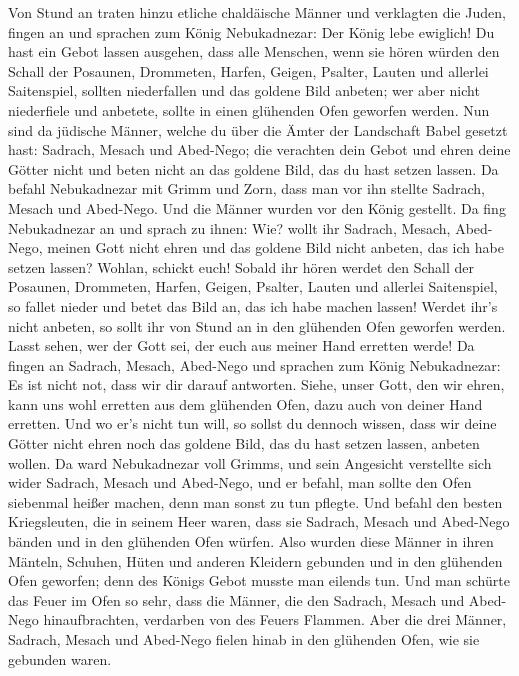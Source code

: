  Von Stund an traten hinzu etliche chaldäische Männer und
verklagten die Juden,  fingen an und sprachen zum König
Nebukadnezar: Der König lebe ewiglich!  Du hast ein Gebot
lassen ausgehen, dass alle Menschen, wenn sie hören würden den Schall
der Posaunen, Drommeten, Harfen, Geigen, Psalter, Lauten und allerlei
Saitenspiel, sollten niederfallen und das goldene Bild anbeten;
 wer aber nicht niederfiele und anbetete, sollte in einen
glühenden Ofen geworfen werden.  Nun sind da jüdische
Männer, welche du über die Ämter der Landschaft Babel gesetzt hast:
Sadrach, Mesach und Abed-Nego; die verachten dein Gebot und ehren deine
Götter nicht und beten nicht an das goldene Bild, das du hast setzen
lassen.  Da befahl Nebukadnezar mit Grimm und Zorn, dass
man vor ihn stellte Sadrach, Mesach und Abed-Nego. Und die Männer wurden
vor den König gestellt.  Da fing Nebukadnezar an und
sprach zu ihnen: Wie? wollt ihr Sadrach, Mesach, Abed-Nego, meinen Gott
nicht ehren und das goldene Bild nicht anbeten, das ich habe setzen
lassen?  Wohlan, schickt euch! Sobald ihr hören werdet
den Schall der Posaunen, Drommeten, Harfen, Geigen, Psalter, Lauten und
allerlei Saitenspiel, so fallet nieder und betet das Bild an, das ich
habe machen lassen! Werdet ihr's nicht anbeten, so sollt ihr von Stund
an in den glühenden Ofen geworfen werden. Lasst sehen, wer der Gott sei,
der euch aus meiner Hand erretten werde!  Da fingen an
Sadrach, Mesach, Abed-Nego und sprachen zum König Nebukadnezar: Es ist
nicht not, dass wir dir darauf antworten.  Siehe, unser
Gott, den wir ehren, kann uns wohl erretten aus dem glühenden Ofen, dazu
auch von deiner Hand erretten.  Und wo er's nicht tun
will, so sollst du dennoch wissen, dass wir deine Götter nicht ehren
noch das goldene Bild, das du hast setzen lassen, anbeten wollen.
 Da ward Nebukadnezar voll Grimms, und sein Angesicht
verstellte sich wider Sadrach, Mesach und Abed-Nego, und er befahl, man
sollte den Ofen siebenmal heißer machen, denn man sonst zu tun pflegte.
 Und befahl den besten Kriegsleuten, die in seinem Heer
waren, dass sie Sadrach, Mesach und Abed-Nego bänden und in den
glühenden Ofen würfen.  Also wurden diese Männer in ihren
Mänteln, Schuhen, Hüten und anderen Kleidern gebunden und in den
glühenden Ofen geworfen;  denn des Königs Gebot musste
man eilends tun. Und man schürte das Feuer im Ofen so sehr, dass die
Männer, die den Sadrach, Mesach und Abed-Nego hinaufbrachten, verdarben
von des Feuers Flammen.  Aber die drei Männer, Sadrach,
Mesach und Abed-Nego fielen hinab in den glühenden Ofen, wie sie
gebunden waren.

